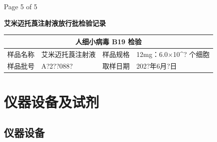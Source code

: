 \documentclass[UTF8,10pt,a4paper,fontset=fandol]{ctexart}
\newcommand{\fieldvalue}[1]{#1}
\newcommand{\handwritten}[1]{#1}
\begin{document}
\noindent
\hfill Page 5 of 5\hfill

\newpage

\begin{center}
\textbf{艾米迈托莨注射液放行批检验记录}
\end{center}

\begin{center}
\small
\begin{tabular}{|p{2.3cm}|p{4.0cm}|p{2.3cm}|p{4.0cm}|}
\hline
\multicolumn{4}{|c|}{人细小病毒 B19 检验}\\
\hline
样品名称 &
\fieldvalue{艾米迈托莨注射液} &
样品规格 &
\fieldvalue{12mg：6.0$\times$10^{?} 个细胞}\\
\hline
样品批号 &
\fieldvalue{\handwritten{A?2??088?}} &
取样日期 &
\fieldvalue{\handwritten{202?年6月?日}}\\
\hline
\end{tabular}
\end{center}

\section{仪器设备及试剂}

\subsection{仪器设备}
\end{document}
